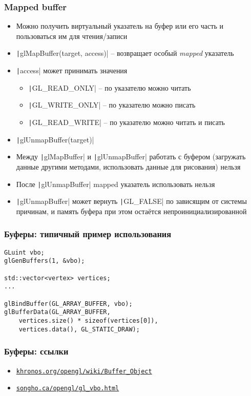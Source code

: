 \documentclass[10pt]{beamer}
\begin{document}
\begin{frame}[fragile]
\frametitle{Mapped buffer}
\begin{itemize}
\item Можно получить виртуальный указатель на буфер или его часть и пользоваться им для чтения/записи
\pause
\item \texttt|glMapBuffer(target, access)| -- возвращает особый \textit{mapped} указатель
\item \texttt|access| может принимать значения
\begin{itemize}
\item \texttt|GL_READ_ONLY| -- по указателю можно читать
\item \texttt|GL_WRITE_ONLY| -- по указателю можно писать
\item \texttt|GL_READ_WRITE| -- по указателю можно читать и писать
\end{itemize}
\pause
\item \texttt|glUnmapBuffer(target)|
\pause
\item Между \texttt|glMapBuffer| и \texttt|glUnmapBuffer| работать с буфером (загружать данные другими методами, использовать данные для рисования) нельзя
\pause
\item После \texttt|glUnmapBuffer| mapped указатель использовать нельзя
\pause
\item \texttt|glUnmapBuffer| может вернуть \texttt|GL_FALSE| по зависящим от системы причинам, и память буфера при этом остаётся непроинициализированной
\end{itemize}
\end{frame}

\begin{frame}[fragile]
\frametitle{Буферы: типичный пример использования}
\begin{verbatim}
GLuint vbo;
glGenBuffers(1, &vbo);

std::vector<vertex> vertices;
...

glBindBuffer(GL_ARRAY_BUFFER, vbo);
glBufferData(GL_ARRAY_BUFFER,
    vertices.size() * sizeof(vertices[0]),
    vertices.data(), GL_STATIC_DRAW);
\end{verbatim}
\end{frame}

\begin{frame}[fragile]
\frametitle{Буферы: ссылки}
\begin{itemize}
\item \href{https://www.khronos.org/opengl/wiki/Buffer_Object}{\nolinkurl{khronos.org/opengl/wiki/Buffer\_Object}}
\item \href{https://www.songho.ca/opengl/gl_vbo.html}{\nolinkurl{songho.ca/opengl/gl\_vbo.html}}
\end{itemize}
\end{frame}
\end{document}
